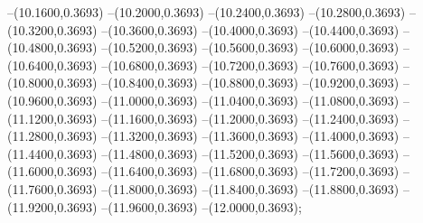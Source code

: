 {	--(10.1600,0.3693)
	--(10.2000,0.3693)
	--(10.2400,0.3693)
	--(10.2800,0.3693)
	--(10.3200,0.3693)
	--(10.3600,0.3693)
	--(10.4000,0.3693)
	--(10.4400,0.3693)
	--(10.4800,0.3693)
	--(10.5200,0.3693)
	--(10.5600,0.3693)
	--(10.6000,0.3693)
	--(10.6400,0.3693)
	--(10.6800,0.3693)
	--(10.7200,0.3693)
	--(10.7600,0.3693)
	--(10.8000,0.3693)
	--(10.8400,0.3693)
	--(10.8800,0.3693)
	--(10.9200,0.3693)
	--(10.9600,0.3693)
	--(11.0000,0.3693)
	--(11.0400,0.3693)
	--(11.0800,0.3693)
	--(11.1200,0.3693)
	--(11.1600,0.3693)
	--(11.2000,0.3693)
	--(11.2400,0.3693)
	--(11.2800,0.3693)
	--(11.3200,0.3693)
	--(11.3600,0.3693)
	--(11.4000,0.3693)
	--(11.4400,0.3693)
	--(11.4800,0.3693)
	--(11.5200,0.3693)
	--(11.5600,0.3693)
	--(11.6000,0.3693)
	--(11.6400,0.3693)
	--(11.6800,0.3693)
	--(11.7200,0.3693)
	--(11.7600,0.3693)
	--(11.8000,0.3693)
	--(11.8400,0.3693)
	--(11.8800,0.3693)
	--(11.9200,0.3693)
	--(11.9600,0.3693)
	--(12.0000,0.3693);
}

